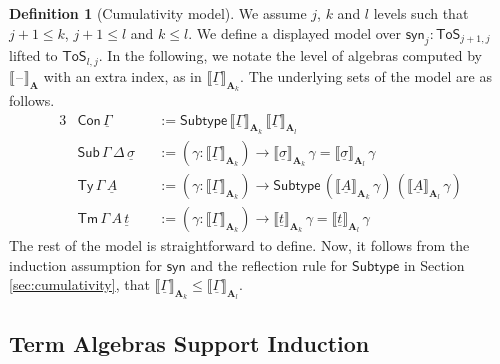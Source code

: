 \documentclass{article}
\theoremstyle{definition}
\newtheorem{definition}{Definition}
\theoremstyle{theorem}
\newcommand{\Con}{\mathsf{Con}}
\newcommand{\Sub}{\mathsf{Sub}}
\newcommand{\Tm}{\mathsf{Tm}}
\newcommand{\Ty}{\mathsf{Ty}}
\newcommand{\blank}{\mathord{\hspace{1pt}\text{--}\hspace{1pt}}}
\newcommand{\ra}{\rightarrow}
\newcommand{\ToS}{\mathsf{ToS}}
\newcommand{\Subtype}{\mathsf{Subtype}}
\newcommand{\syn}{\mathsf{syn}}
\newcommand{\bA}{\boldsymbol{A}}
\newcommand{\ul}[1]{\underline{#1}}
\newcommand{\ulGamma}{\ul{\Gamma}}
\newcommand{\ulsigma}{\ul{\sigma}}
\newcommand{\ult}{\ul{t}}
\newcommand{\ulA}{\ul{A}}
\newcommand{\llb}{\llbracket}
\newcommand{\rrb}{\rrbracket}
\begin{document}
\begin{definition}[Cumulativity model]
We assume $j$, $k$ and $l$ levels such that $j+1 \leq k$, $j+1 \leq l$ and $k
\leq l$. We define a displayed model over $\syn_j : \ToS_{j+1, j}$ lifted to
$\ToS_{l, j}$. In the following, we notate the level of algebras computed by
$\llb\blank\rrb_{\bA}$ with an extra index, as in
$\llb\ulGamma\rrb_{\bA_k}$. The underlying sets of the model are as follows.
\begin{alignat*}{3}
  & \Con\,\ulGamma && := \Subtype\,\llb\ulGamma\rrb_{\bA_k}\,\llb\ulGamma\rrb_{\bA_l}\\
  & \Sub\,\Gamma\,\Delta\,\ulsigma && := (\gamma : \llb\ulGamma\rrb_{\bA_k})\ra
  \llb\ulsigma\rrb_{\bA_k}\,\gamma = \llb\ulsigma\rrb_{\bA_l}\,\gamma\\
  & \Ty\,\Gamma\,\ulA &&:= (\gamma : \llb\ulGamma\rrb_{\bA_k})\ra
      \Subtype\,(\llb\ulA\rrb_{\bA_k}\,\gamma)\,(\llb\ulA\rrb_{\bA_l}\,\gamma)\\
  & \Tm\,\Gamma\,A\,\ult &&:= (\gamma : \llb\ulGamma\rrb_{\bA_k})\ra
     \llb\ult\rrb_{\bA_k}\,\gamma = \llb\ult\rrb_{\bA_l}\,\gamma
\end{alignat*}
The rest of the model is straightforward to define. Now, it follows from the
induction assumption for $\syn$ and the reflection rule for $\Subtype$ in
Section \ref{sec:cumulativity}, that $\llb\ulGamma\rrb_{\bA_k} \leq
\llb\ulGamma\rrb_{\bA_l}$.
\end{definition}

\subsection{Term Algebras Support Induction}
\end{document}
